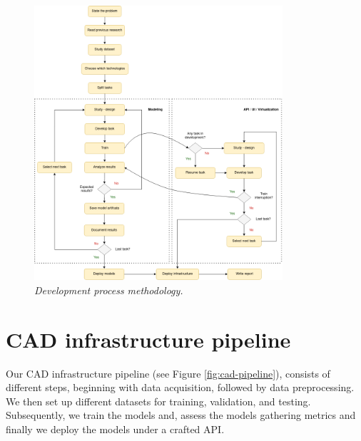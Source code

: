 \newpage

\begin{landscape}

  \begin{figure}[H]
  \centering
  \includegraphics[width=0.82\textwidth]{imatges/planing_and_methodology/EmplyedMethodology.png}
  \caption{\textit{Development process methodology.}}
  \label{fig:flux_development}
  \end{figure}

\end{landscape}

\newpage

\section{CAD infrastructure pipeline}

Our CAD infrastructure pipeline  (see Figure \ref{fig:cad-pipeline}), consists
of different steps, beginning with data acquisition, followed by data
preprocessing. We then set up different datasets for training, validation, and
testing. Subsequently, we train the models and, assess the models gathering
metrics and finally we deploy the models under a crafted API.

